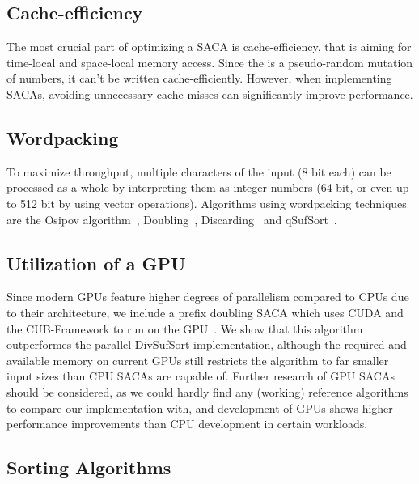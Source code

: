 \subsection{Cache-efficiency}

The most crucial part of optimizing a SACA is cache-efficiency, that is aiming for time-local and space-local memory access.
Since the \sa is a pseudo-random mutation of numbers, it can't be written cache-efficiently.
However, when implementing SACAs, avoiding unnecessary cache misses can significantly improve performance.

\subsection{Wordpacking}

To maximize throughput, multiple characters of the input (8 bit each) can be processed as a whole by
interpreting them as integer numbers (64 bit, or even up to 512 bit by using vector operations).
Algorithms using wordpacking techniques are the Osipov algorithm~\cite{osipovGPU},
Doubling~\cite{saca:11}, Discarding~\cite{saca:11} and qSufSort~\cite{saca:1}.

\subsection{Utilization of a GPU}

Since modern GPUs feature higher degrees of parallelism compared to CPUs due to their architecture,
we include a prefix doubling SACA which uses CUDA and the CUB-Framework to run on the GPU~\cite{osipovGPU}.
We show that this algorithm outperformes the parallel DivSufSort implementation,
although the required and available memory on current GPUs still restricts the algorithm to far smaller input sizes than CPU SACAs are capable of.
Further research of GPU SACAs should be considered,
as we could hardly find any (working) reference algorithms to compare our implementation with, 
and development of GPUs shows higher performance improvements than CPU development in certain workloads.

\subsection{Sorting Algorithms}

